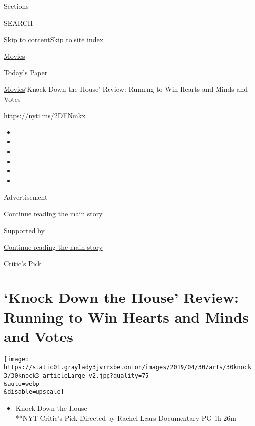 Sections

SEARCH

\protect\hyperlink{site-content}{Skip to
content}\protect\hyperlink{site-index}{Skip to site index}

\href{https://www.nytimes3xbfgragh.onion/section/movies}{Movies}

\href{https://myaccount.nytimes3xbfgragh.onion/auth/login?response_type=cookie\&client_id=vi}{}

\href{https://www.nytimes3xbfgragh.onion/section/todayspaper}{Today's
Paper}

\href{/section/movies}{Movies}\textbar{}`Knock Down the House' Review:
Running to Win Hearts and Minds and Votes

\url{https://nyti.ms/2DFNmkx}

\begin{itemize}
\item
\item
\item
\item
\item
\item
\end{itemize}

Advertisement

\protect\hyperlink{after-top}{Continue reading the main story}

Supported by

\protect\hyperlink{after-sponsor}{Continue reading the main story}

Critic's Pick

\hypertarget{knock-down-the-house-review-running-to-win-hearts-and-minds-and-votes}{%
\section{`Knock Down the House' Review: Running to Win Hearts and Minds
and
Votes}\label{knock-down-the-house-review-running-to-win-hearts-and-minds-and-votes}}

\texttt{[image: https://static01.graylady3jvrrxbe.onion/images/2019/04/30/arts/30knock3/30knock3-articleLarge-v2.jpg?quality=75\\\&auto=webp\\\&disable=upscale]}

\begin{itemize}
\tightlist
\item
  Knock Down the House\\
  **NYT Critic's Pick Directed by Rachel Lears Documentary PG 1h 26m
\end{itemize}

